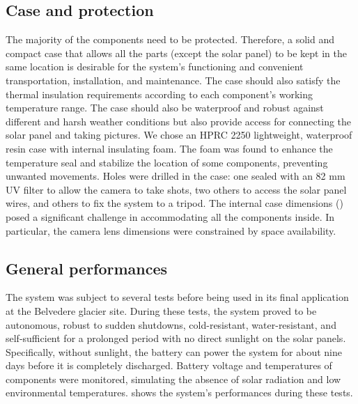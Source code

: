 \subsection{Case and protection}\label{Case and protection} 
The majority of the components need to be protected.
Therefore, a solid and compact case that allows all the parts (except the solar panel) to be kept in the same location is desirable for the system's functioning and convenient transportation, installation, and maintenance. 
The case should also satisfy the thermal insulation requirements according to each component's working temperature range. 
The case should also be waterproof and robust against different and harsh weather conditions but also provide access for connecting the solar panel and taking pictures. 
We chose an HPRC 2250 lightweight, waterproof resin case with internal insulating foam.
The foam was found to enhance the temperature seal and stabilize the location of some components, preventing unwanted movements. 
Holes were drilled in the case: one sealed with an 82 mm UV filter to allow the camera to take shots, two others to access the solar panel wires, and others to fix the system to a tripod. 
The internal case dimensions () posed a significant challenge in accommodating all the components inside. 
In particular, the camera lens dimensions were constrained by space availability.

\subsection{General performances}\label{General_performances}
The system was subject to several tests before being used in its final application at the Belvedere glacier site. During these tests, the system proved to be autonomous, robust to sudden shutdowns, cold-resistant, water-resistant, and self-sufficient for a prolonged period with no direct sunlight on the solar panels. 
Specifically, without sunlight, the battery can power the system for about nine days before it is completely discharged. 
Battery voltage and temperatures of components were monitored, simulating the absence of solar radiation and low environmental temperatures.
 shows the system's performances during these tests.


